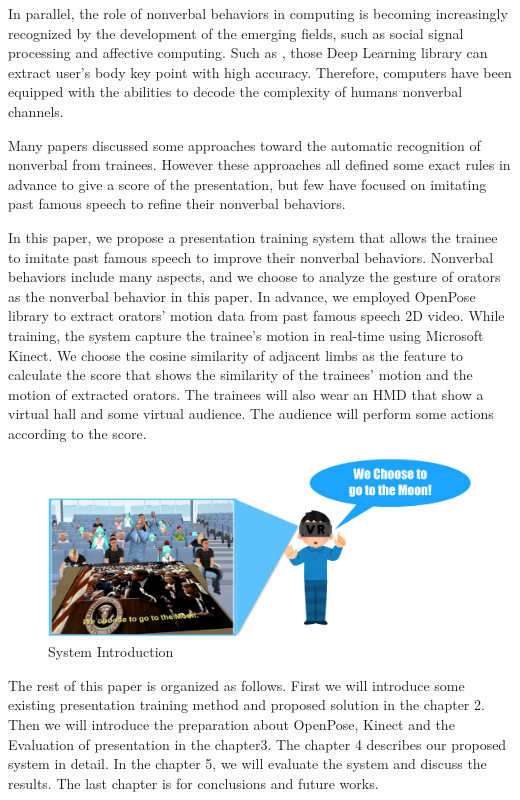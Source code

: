 \par In parallel, the role of nonverbal behaviors in computing is becoming increasingly recognized by the development of the emerging fields, such as social signal processing and affective computing. Such as \cite{Chen,cao2017realtime,Fang2016,Papandreou2017,He2017}, those Deep Learning library can extract user's body key point with high accuracy. Therefore, computers have been equipped with the abilities to decode the complexity of humans nonverbal channels. 

\par Many papers discussed some approaches toward the automatic recognition of nonverbal from trainees. However these approaches all defined some exact rules in advance to give a score of the presentation, but few have focused on imitating past famous speech to refine their nonverbal behaviors. 
 
\par In this paper, we propose a presentation training system that allows the trainee to imitate past famous speech to improve their nonverbal behaviors. Nonverbal behaviors include many aspects, and we choose to analyze the gesture of orators as the nonverbal behavior in this paper. In advance, we employed OpenPose library\cite{cao2017realtime} to extract orators' motion data from past famous speech 2D video. While training, the system capture the trainee's motion in real-time using Microsoft Kinect. We choose the cosine similarity of adjacent limbs as the feature to calculate the score that shows the similarity of the trainees' motion and the motion of extracted orators. The trainees will also wear an HMD that show a virtual hall and some virtual audience. The audience will perform some actions according to the score.
\begin{figure}[htbp]
\centering\includegraphics[scale=0.225]{./img/Introduction.png}
\caption{System Introduction}\label{fig:System Introduction}
\end{figure}

\par The rest of this paper is organized as follows. First we will introduce some existing presentation training method and proposed solution in the chapter 2. Then we will introduce the preparation about OpenPose, Kinect and the Evaluation of presentation in the chapter3. The chapter 4 describes our proposed system in detail. In the chapter 5, we will evaluate the system and discuss the results. The last chapter is for conclusions and future works.
